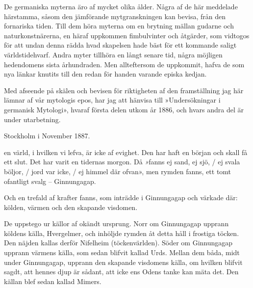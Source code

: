 De germaniska myterna äro af mycket olika ålder. Några af de här
meddelade härstamma, såsom den jämförande mytgranskningen kan bevisa,
från den fornariska tiden. Till dem höra myterna om en brytning mällan
gudarne och naturkonstnärerna, en häraf uppkommen fimbulvinter och
åtgärder, som vidtogos för att undan denna rädda hvad skapelsen hade
bäst för ett kommande saligt världstidehvarf. Andra myter
tillhöra en långt senare tid, några möjligen hedendomens sista
århundraden. Men allteftersom de uppkommit, hafva de som nya länkar
knutits till den redan för handen varande episka kedjan.

Med afseende på skälen och bevisen för riktigheten af den framställning
jag här lämnar af vår mytologis epos, har jag att hänvisa till
»Undersökningar i germanisk Mytologi», hvaraf första delen utkom år
1886, och hvars andra del är under utarbetning.

Stockholm i November 1887.








\dropcapD en värld, i hvilken vi lefva, är icke af evighet. Den har haft en
början och skall få ett slut. Det har varit en tidernas morgon. Då 
{\emph »fanns ej sand, ej sjö, / ej svala böljor, / jord var icke, / ej himmel där ofvan»},
men rymden fanns, ett tomt ofantligt svalg -- Ginnungagap.

Och en trefald af krafter fanns, som inträdde i Ginnungagap och värkade
där: kölden, värmen och den skapande visdomen.

De uppstego ur källor af okändt ursprung. Norr om Ginnungagap upprann
köldens källa, Hvergelmer, och inhöljde rymden åt detta håll i frostiga
töcken. Den näjden kallas derför Nifelheim (töckenvärlden). Söder om
Ginnungagap upprann värmens källa, som sedan blifvit kallad Urds. Mellan
dem båda, midt under Ginnungagap, upprann den skapande visdomens källa,
om hvilken blifvit sagdt, att hennes djup är sådant, att icke ens Odens
tanke kan mäta det. Den källan blef sedan kallad Mimers.

